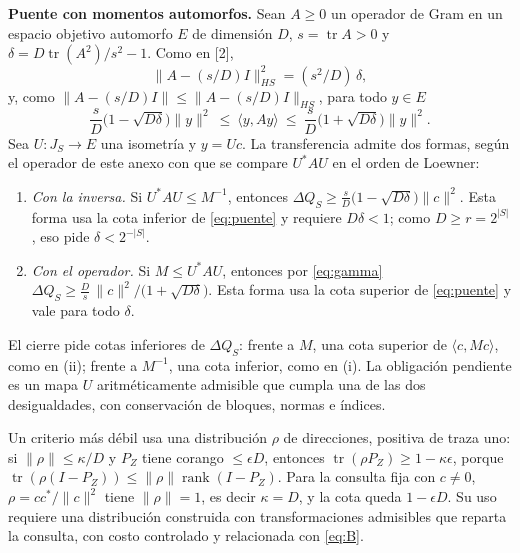 \documentclass[11pt,a4paper]{article}
\theoremstyle{plain}
\newcommand{\tr}{\operatorname{tr}}
\newcommand{\rank}{\operatorname{rank}}
\begin{document}
\textbf{Puente con momentos automorfos.} Sean $A\ge0$ un operador de Gram en un espacio objetivo automorfo $E$ de dimensión $D$, $s=\tr A>0$ y $\delta=D\tr(A^2)/s^2-1$. Como en [2],
\[
\|A-(s/D)I\|_{HS}^2=(s^2/D)\,\delta,
\]
y, como $\|A-(s/D)I\|\le\|A-(s/D)I\|_{HS}$, para todo $y\in E$
\begin{equation}\label{eq:puente}
\frac sD\bigl(1-\sqrt{D\delta}\bigr)\|y\|^2\ \le\ \langle y,Ay\rangle\ \le\ \frac sD\bigl(1+\sqrt{D\delta}\bigr)\|y\|^2 .
\end{equation}
Sea $U:J_S\to E$ una isometría y $y=Uc$. La transferencia admite dos formas, según el operador de este anexo con que se compare $U^*AU$ en el orden de Loewner:
\begin{enumerate}[label=(\roman*),leftmargin=2em,itemsep=2pt]
\item \emph{Con la inversa.} Si $U^*AU\le M^{-1}$, entonces $\Delta Q_S\ge\frac sD\bigl(1-\sqrt{D\delta}\bigr)\|c\|^2$. Esta forma usa la cota inferior de \eqref{eq:puente} y requiere $D\delta<1$; como $D\ge r=2^{|S|}$, eso pide $\delta<2^{-|S|}$.
\item \emph{Con el operador.} Si $M\le U^*AU$, entonces por \eqref{eq:gamma} $\Delta Q_S\ge\frac Ds\,\|c\|^2/\bigl(1+\sqrt{D\delta}\bigr)$. Esta forma usa la cota superior de \eqref{eq:puente} y vale para todo $\delta$.
\end{enumerate}
El cierre pide cotas inferiores de $\Delta Q_S$: frente a $M$, una cota superior de $\langle c,Mc\rangle$, como en (ii); frente a $M^{-1}$, una cota inferior, como en (i). La obligación pendiente es un mapa $U$ aritméticamente admisible que cumpla una de las dos desigualdades, con conservación de bloques, normas e índices.

Un criterio más débil usa una distribución $\rho$ de direcciones, positiva de traza uno: si $\|\rho\|\le\kappa/D$ y $P_Z$ tiene corango $\le\epsilon D$, entonces $\tr(\rho P_Z)\ge1-\kappa\epsilon$, porque $\tr(\rho(I-P_Z))\le\|\rho\|\rank(I-P_Z)$. Para la consulta fija con $c\ne0$, $\rho=cc^*/\|c\|^2$ tiene $\|\rho\|=1$, es decir $\kappa=D$, y la cota queda $1-\epsilon D$. Su uso requiere una distribución construida con transformaciones admisibles que reparta la consulta, con costo controlado y relacionada con \eqref{eq:B}.
\end{document}
